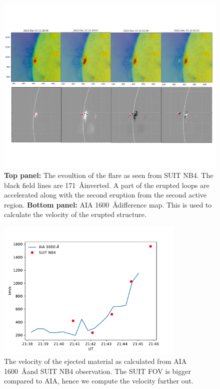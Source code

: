 \documentclass[a4paper,11pt]{article}
\begin{document}
\begin{figure}[ht!]
    \centering
    \includegraphics[trim={2cm 2cm 1cm 2cm},clip,width=\textwidth]{Figures/dec31st_evet_ev.pdf}
    \caption{\textbf{Top panel:} The evoultion of the flare as seen from SUIT NB4. The black field lines are 171~\AA inverted. A part of the erupted loops are accelerated along with the second eruption from the second active region. \textbf{Bottom panel:} AIA 1600~\AA difference map. This is used to calculate the velocity of the erupted structure.}
    \label{fig:suit_evolve}
    \end{figure}

\begin{figure}[ht!]
    \centering
    \includegraphics[width=0.8\textwidth]{Figures/cme_vel.pdf}
    \caption{The velocity of the ejected material as calculated from AIA 1600~\AA and SUIT NB4 observation. The SUIT FOV is bigger compared to AIA, hence we compute the velocity further out.}
    \label{fig:cme_vel}
    \end{figure}
\end{document}
